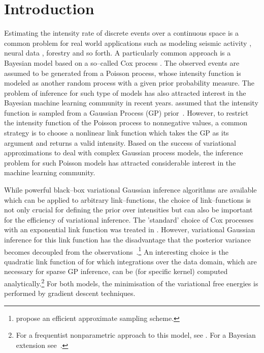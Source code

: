 \documentclass[twoside,11pt]{article}
\begin{document}
\section{Introduction}
Estimating the intensity rate of discrete events over a continuous space is a common problem for real world applications such as modeling seismic activity \citep{ogata1998space}, neural data \citep{brillinger1988maximum}, forestry \citep{stoyan2000recent} and so forth. A particularly common approach is a Bayesian model based on a so--called Cox process \citep{cox1955some}. The observed events are assumed to be generated from a Poisson process, whose intensity function is modeled as another random process with a given prior probability measure. The problem of inference for such type of models has also attracted interest in the Bayesian machine learning community in recent years. \citet{moller1998log,brix2001spatiotemporal,cunningham2008inferring} assumed that the intensity function is sampled from a Gaussian Process (GP) prior~\citep{rasmussen2006gaussian}. However, to restrict the intensity function of the Poisson process to nonnegative values, a common strategy is to choose a nonlinear link function which takes the GP as its argument and returns a valid intensity. Based on the success of variational approximations to deal with complex Gaussian process models, the
inference problem for such Poisson models has attracted considerable interest in the machine learning community. 

While powerful black--box variational Gaussian inference algorithms are available which can be applied to arbitrary link--functions, the choice of link--functions is not only crucial for defining the prior over intensities but can also be important for the efficiency of variational inference. The 'standard' choice of 
Cox processes with an exponential link function was treated in \citep{hensman2015mcmc}.
However, variational Gaussian inference for this link function has the disadvantage 
that the posterior variance becomes decoupled from the observations~\citep{lloyd2015variational}.\footnote{\citet{samo2015scalable} propose an efficient approximate sampling scheme.} An interesting choice is the quadratic link function of \citep{lloyd2015variational} for which integrations over the data domain, which are necessary for sparse GP inference, can be (for specific kernel) computed analytically.\footnote{For a frequentist nonparametric approach to this model, see \citep{flaxman2017poisson}. For a Bayesian extension see~\citep{walder17fast}.} For both models, the minimisation of the variational free energies is performed by gradient descent techniques.
\end{document}
